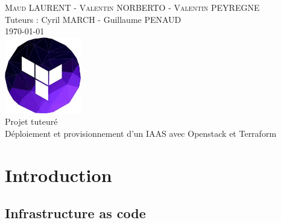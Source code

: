\documentclass[]{article}
\date{}
\begin{document}
\makeatletter
\begin{titlepage}
\centering
\textsc{Maud LAURENT - Valentin NORBERTO - Valentin PEYREGNE} \\
Tuteurs : Cyril MARCH - Guillaume PENAUD \\
\vspace{1cm}
\textsc{\today}\\
\vspace{5cm}
\includegraphics[width=0.25\textwidth]{Images/download.jpeg} \\
\vspace{1cm}
\Huge{Projet tuteuré \\ Déploiement et provisionnement d’un IAAS avec Openstack et Terraform}\\
\vfill
\end{titlepage}
\makeatother

\tableofcontents
\newpage

\section{Introduction}\label{introduction}

\subsection{Infrastructure as code}\label{infrastructure-as-code}
\end{document}

